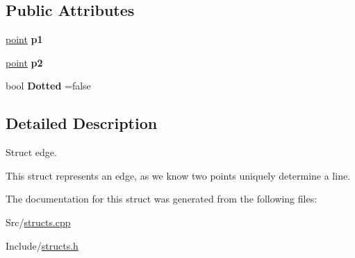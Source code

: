 \subsection*{Public Attributes}
\begin{DoxyCompactItemize}
\item 
\hyperlink{structpoint}{point} {\bfseries p1}\hypertarget{structedge_a7b074374ee3059d29a93e9e76480274e}{}\label{structedge_a7b074374ee3059d29a93e9e76480274e}

\item 
\hyperlink{structpoint}{point} {\bfseries p2}\hypertarget{structedge_a105ba74e7b01aba7e0e113ab286dc883}{}\label{structedge_a105ba74e7b01aba7e0e113ab286dc883}

\item 
bool {\bfseries Dotted} =false\hypertarget{structedge_ae35774472063d8f38a1ce7b375b39921}{}\label{structedge_ae35774472063d8f38a1ce7b375b39921}

\end{DoxyCompactItemize}


\subsection{Detailed Description}
Struct edge. 

This struct represents an edge, as we know two points uniquely determine a line. 

The documentation for this struct was generated from the following files\+:\begin{DoxyCompactItemize}
\item 
Src/\hyperlink{structs_8cpp}{structs.\+cpp}\item 
Include/\hyperlink{structs_8h}{structs.\+h}\end{DoxyCompactItemize}

